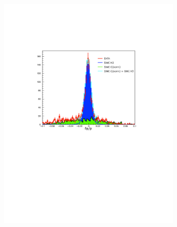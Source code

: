 \documentclass[12pt]{article}
\begin{document}
\begin{figure}[htbp]
\centering
        \begin{subfigure}[htbp]{0.46\textwidth}
               \centering
               \includegraphics[width=\textwidth]{cnorm_5}
                \label{apsingled}
      \end{subfigure}
          \begin{subfigure}[htbp]{0.39\textwidth}
                \centering

\end{subfigure}
\end{figure}
\end{document}
